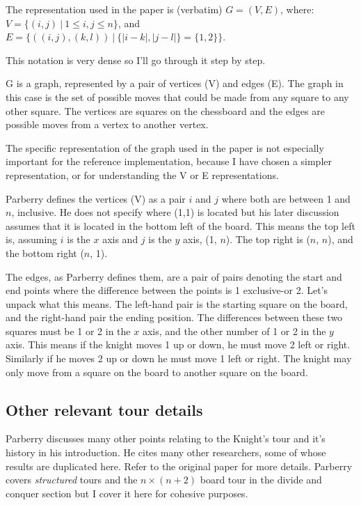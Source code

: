 \documentclass[11pt, a4paper]{article}
\begin{document}
The representation used in the paper is (verbatim) $G = (V,E)$, where: $V = \{(i,j)\ |\ 1 \le i,j \le n\}$, and $E = \{((i,j),(k,l))\ |\ \{|i-k|,|j-l|\} = \{1,2\}\}$.

This notation is very dense so I'll go through it step by step.

G is a graph, represented by a pair of vertices (V) and edges (E). The graph in this case is the set of possible moves that could be made from any square to any other square. The vertices are squares on the chessboard and the edges are possible moves from a vertex to another vertex.

The specific representation of the graph used in the paper is not especially important for the reference implementation, because I have chosen a simpler representation, or for understanding the V or E representations.

Parberry defines the vertices (V) as a pair $i$ and $j$ where both are between 1 and $n$, inclusive. He does not specify where (1,1) is located but his later discussion assumes that it is located in the bottom left of the board. This means the top left is, assuming $i$ is the $x$ axis and $j$ is the $y$ axis, (1, $n$). The top right is ($n$, $n$), and the bottom right ($n$, 1).


The edges, as Parberry defines them, are a pair of pairs denoting the start and end points where the difference between the points is 1 exclusive-or 2. Let's unpack what this means. The left-hand pair is the starting square on the board, and the right-hand pair the ending position. The differences between these two squares must be 1 or 2 in the $x$ axis, and the other number of 1 or 2 in the $y$ axis. This means if the knight moves 1 up or down, he must move 2 left or right. Similarly if he moves 2 up or down he must move 1 left or right. The knight may only move from a square on the board to another square on the board.


\subsection{Other relevant tour details}

Parberry discusses many other points relating to the Knight's tour and it's history in his introduction. He cites many other researchers, some of whose results are duplicated here. Refer to the original paper for more details. Parberry covers \emph{structured} tours and the $n \times (n + 2)$ board tour in the divide and conquer section but I cover it here for cohesive purposes.
\end{document}
